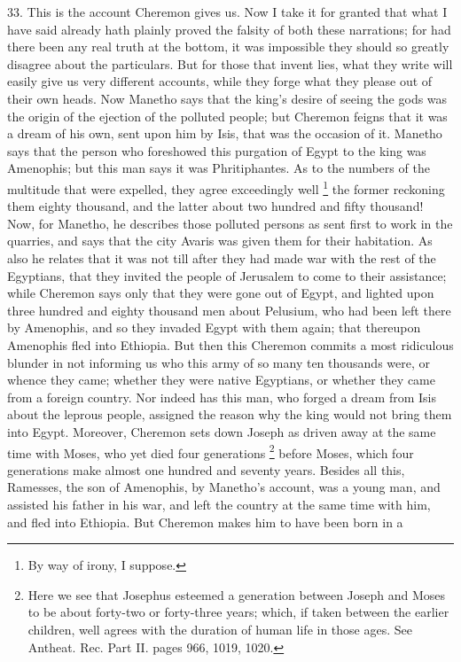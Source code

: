 33. This is the account Cheremon gives us. Now I take it for granted that
what I have said already hath plainly proved the falsity of both these
narrations; for had there been any real truth at the bottom, it was
impossible they should so greatly disagree about the particulars. But for
those that invent lies, what they write will easily give us very different
accounts, while they forge what they please out of their own heads. Now
Manetho says that the king's desire of seeing the gods was the origin of
the ejection of the polluted people; but Cheremon feigns that it was a
dream of his own, sent upon him by Isis, that was the occasion of it.
Manetho says that the person who foreshowed this purgation of Egypt to the
king was Amenophis; but this man says it was Phritiphantes. As to the
numbers of the multitude that were expelled, they agree exceedingly well
\footnote{By way of irony, I
suppose.}
the former reckoning them eighty thousand, and the latter about two
hundred and fifty thousand! Now, for Manetho, he describes those polluted
persons as sent first to work in the quarries, and says that the city
Avaris was given them for their habitation. As also he relates that it was
not till after they had made war with the rest of the Egyptians, that they
invited the people of Jerusalem to come to their assistance; while
Cheremon says only that they were gone out of Egypt, and lighted upon
three hundred and eighty thousand men about Pelusium, who had been left
there by Amenophis, and so they invaded Egypt with them again; that
thereupon Amenophis fled into Ethiopia. But then this Cheremon commits a
most ridiculous blunder in not informing us who this army of so many ten
thousands were, or whence they came; whether they were native Egyptians,
or whether they came from a foreign country. Nor indeed has this man, who
forged a dream from Isis about the leprous people, assigned the reason why
the king would not bring them into Egypt. Moreover, Cheremon sets down
Joseph as driven away at the same time with Moses, who yet died four
generations \footnote{Here we see that Josephus
esteemed a generation between Joseph and Moses to be about forty-two or
forty-three years; which, if taken between the earlier children, well
agrees with the duration of human life in those ages. See Antheat. Rec.
Part II. pages 966, 1019, 1020.} before Moses, which four
generations make almost one hundred and seventy years. Besides all this,
Ramesses, the son of Amenophis, by Manetho's account, was a young man, and
assisted his father in his war, and left the country at the same time with
him, and fled into Ethiopia. But Cheremon makes him to have been born in a
